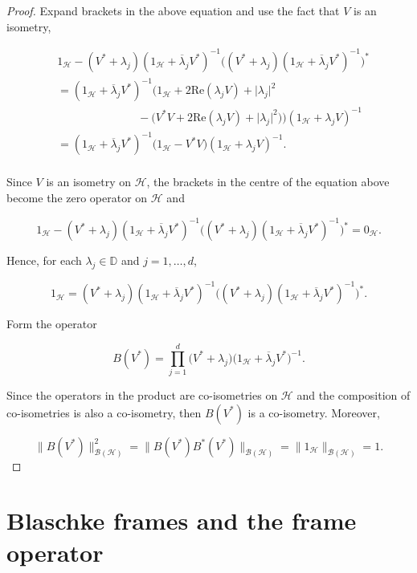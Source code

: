 \documentclass[10pt, reqno]{amsart}
\theoremstyle{definition}
\numberwithin{equation}{section}
\begin{document}
\begin{proof}
\noindent Expand brackets in the above equation and use the fact that $V$ is an isometry,

\begin{align*}
    &1_{\mathcal{H}}-(V^{*}+\lambda_{j})(1_{\mathcal{H}}+\overline{\lambda}_{j}V^{*})^{-1}\bigg((V^{*}+\lambda_{j})(1_{\mathcal{H}}+\overline{\lambda}_{j}V^{*})^{-1}\bigg)^{*} \\
    &=(1_{\mathcal{H}}+\overline{\lambda}_{j}V^{*})^{-1}\bigg(1_{\mathcal{H}}+2\mathrm{Re}(\lambda_{j}V)+\lvert\lambda_{j}\rvert^{2}\\
    &\hspace{3cm}-\Big(V^{*}V+2\mathrm{Re}(\lambda_{j}V)+\lvert\lambda_{j}\rvert^{2}\Big)\bigg)(1_{\mathcal{H}}+\lambda_{j}V)^{-1}\\
    &=(1_{\mathcal{H}}+\overline{\lambda}_{j}V^{*})^{-1}\bigg(1_{\mathcal{H}}-V^{*}V\bigg)(1_{\mathcal{H}}+\lambda_{j}V)^{-1}.\\
\end{align*}

\noindent Since $V$ is an isometry on $\mathcal{H}$, the brackets in the centre of the equation above become the zero operator on $\mathcal{H}$ and

$$1_{\mathcal{H}}-(V^{*}+\lambda_{j})(1_{\mathcal{H}}+\overline{\lambda}_{j}V^{*})^{-1}\bigg((V^{*}+\lambda_{j})(1_{\mathcal{H}}+\overline{\lambda}_{j}V^{*})^{-1}\bigg)^{*}=0_{\mathcal{H}}.$$

\noindent Hence, for each $\lambda_{j}\in\mathbb{D}$ and $j=1,\hdots,d$,

$$1_{\mathcal{H}}=(V^{*}+\lambda_{j})(1_{\mathcal{H}}+\overline{\lambda}_{j}V^{*})^{-1}\bigg((V^{*}+\lambda_{j})(1_{\mathcal{H}}+\overline{\lambda}_{j}V^{*})^{-1}\bigg)^{*}.$$

Form the operator 

$$B(V^{*}) = \prod_{j=1}^{d}\big(V^{*}+\lambda_{j}\big)\big(1_{\mathcal{H}}+\overline{\lambda}_{j}V^{*}\big)^{-1}.$$

\noindent Since the operators in the product are co-isometries on $\mathcal{H}$ and the composition of co-isometries is also a co-isometry, then $B(V^{*})$ is a co-isometry. Moreover, 

$$\|B(V^{*})\|^{2}_{\mathcal{B}(\mathcal{H})} = \|B(V^{*})B^{*}(V^{*})\|_{\mathcal{B}(\mathcal{H})} = \|1_{\mathcal{H}}\|_{\mathcal{B}(\mathcal{H})} = 1.$$\end{proof}

\section{Blaschke frames and the frame operator}\label{blaschkeframeframeoperator}
\end{document}
